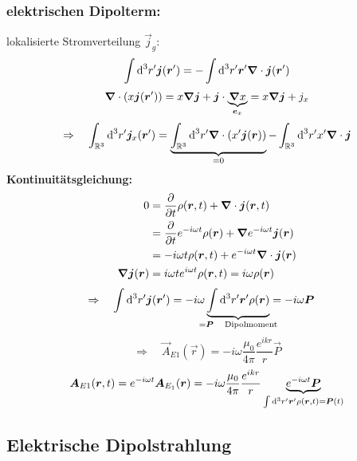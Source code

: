 \subsubsection{elektrischen Dipolterm:}

lokalisierte Stromverteilung $ \vec{j}_g $:
\begin{equation*}
\int \textrm{d}^3 r' \bm{j}(\bm{r}') = - \int \textrm{d}^3 r' \bm{r}' \bm{\nabla} \cdot \bm{j}(\bm{r}')
\end{equation*}
\begin{equation*}
\bm{\nabla} \cdot ( x \bm{j}(\bm{r}')) = x \bm{\nabla} \bm{j} + \bm{j} \cdot \underbrace{\bm{\nabla} x}_{\bm{e}_x} = x \bm{\nabla} \bm{j} + j_x
\end{equation*}
\begin{equation*}
\Rightarrow \quad \int_{\mathbb{R}^3} \textrm{d}^3 r' \bm{j}_x(\bm{r}') = \underbrace{\int_{\mathbb{R}^3} \textrm{d}^3 r' \bm{\nabla} \cdot \left(x' \bm{j}(\bm{r})\right)}_{= 0} - \int_{\mathbb{R}^3} \textrm{d}^3 r' x' \bm{\nabla} \cdot \bm{j}
\end{equation*}
\textbf{Kontinuitätsgleichung:}
\begin{align*}
0 &= \frac{\partial }{\partial t} \rho(\bm{r},t) + \bm{\nabla} \cdot \bm{j}(\bm{r},t)\\
&= \frac{\partial }{\partial t} e^{-i\omega t} \rho(\bm{r}) + \bm{\nabla} e^{-i\omega t} \bm{j}(\bm{r})\\
&= - i \omega t \rho(\bm{r},t) + e^{- i \omega t} \bm{\nabla} \cdot \bm{j}(\bm{r})\\
\bm{\nabla} \bm{j}(\bm{r}) &= i \omega t e^{i \omega t} \rho(\bm{r},t) = i \omega \rho(\bm{r})
\end{align*}
\begin{align*}
\Rightarrow \quad \int \dd^3 r' \vec{j}(\vec{r}') &= - i \omega \ub{\int \dd^3 r' \vec{r}' \rho(\vec{r})}_{\mathclap{= \vec{P} \quad \tx{Dipolmoment}}} = - i \omega \vec{P}
\end{align*}
\begin{equation*}
\Rightarrow \quad \vec{A}_{E1} (\vec{r}) = - i \omega \frac{\mu_0}{4 \pi} \frac{e^{i k r}}{r} \vec{P}
\end{equation*}
\begin{equation*}
\bm{A}_{E1} (\bm{r},t) = e^{- i \omega t} \bm{A}_{E_1}(\bm{r}) = - i \omega \frac{\mu_0}{4 \pi} \frac{e^{i k r}}{r} \underbrace{e^{- i \omega t} \bm{P}}_{\int \textrm{d}^3 r' \bm{r}' \rho(\bm{r},t) = \bm{P}(t)}
\end{equation*}

\subsection{Elektrische Dipolstrahlung}

